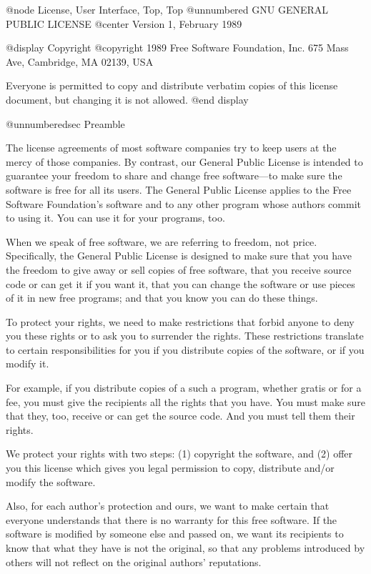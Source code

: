 @node License, User Interface, Top, Top
@unnumbered GNU GENERAL PUBLIC LICENSE
@center Version 1, February 1989

@display
Copyright @copyright{} 1989 Free Software Foundation, Inc.
675 Mass Ave, Cambridge, MA 02139, USA

Everyone is permitted to copy and distribute verbatim copies
of this license document, but changing it is not allowed.
@end display

@unnumberedsec Preamble

  The license agreements of most software companies try to keep users
at the mercy of those companies.  By contrast, our General Public
License is intended to guarantee your freedom to share and change free
software---to make sure the software is free for all its users.  The
General Public License applies to the Free Software Foundation's
software and to any other program whose authors commit to using it.
You can use it for your programs, too.

  When we speak of free software, we are referring to freedom, not
price.  Specifically, the General Public License is designed to make
sure that you have the freedom to give away or sell copies of free
software, that you receive source code or can get it if you want it,
that you can change the software or use pieces of it in new free
programs; and that you know you can do these things.

  To protect your rights, we need to make restrictions that forbid
anyone to deny you these rights or to ask you to surrender the rights.
These restrictions translate to certain responsibilities for you if you
distribute copies of the software, or if you modify it.

  For example, if you distribute copies of a such a program, whether
gratis or for a fee, you must give the recipients all the rights that
you have.  You must make sure that they, too, receive or can get the
source code.  And you must tell them their rights.

  We protect your rights with two steps: (1) copyright the software, and
(2) offer you this license which gives you legal permission to copy,
distribute and/or modify the software.

  Also, for each author's protection and ours, we want to make certain
that everyone understands that there is no warranty for this free
software.  If the software is modified by someone else and passed on, we
want its recipients to know that what they have is not the original, so
that any problems introduced by others will not reflect on the original
authors' reputations.

